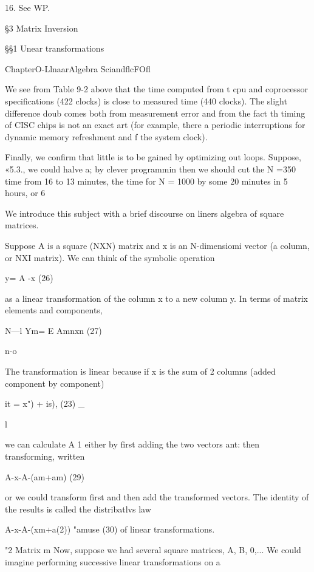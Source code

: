 {{{{{{{{16. See WP.



\S3 Matrix Inversion

\S\S1 Unear transformations

  
 
    
   
   
  

ChapterO-LlnaarAlgebra SciandflcFOfl

We see from Table 9-2 above that the time computed from t
cpu and coprocessor specifications (422 clocks) is close to
measured time (440 clocks). The slight difference doub
comes both from measurement error and from the fact th
timing of CISC chips is not an exact art (for example, there a
periodic interruptions for dynamic memory refreshment and f
the system clock).

Finally, we confirm that little is to be gained by optimizing out
loops. Suppose, «5.3., we could halve a; by clever programmin
then we should cut the N =350 time from 16 to 13 minutes,
the time for N = 1000 by some 20 minutes in 5 hours, or 6%

We introduce this subject with a brief discourse on liners
algebra of square matrices.

Suppose A is a square (NXN) matrix and x is an N-dimensiomi
vector (a column, or NXI matrix). We can think of the symbolic
operation

y= A -x (26)

 

as a linear transformation of the column x to a new column y. In
terms of matrix elements and components,

N—l
Ym= E Amnxn (27)

n-o

The transformation is linear because if x is the sum of 2 columns
(added component by component)

it = x") + is), (23) \_

l

we can calculate A 1 either by first adding the two vectors ant:
then transforming, written

A-x-A-(am+am) (29)

or we could transform first and then add the transformed vectors.
The identity of the results is called the distribatlvs law

A-x-A-(xm+a(2)) "amuse (30)
of linear transformations.

"2 Matrix m
Now, suppose we had several square matrices, A, B, 0,... We
could imagine performing successive linear transformations on a

}}}}}}}}
